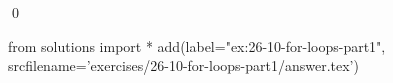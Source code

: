 
\begin{ex}
  \label{ex:26-10-for-loops-part1}
  
  \qed
\end{ex}
\begin{python0}
from solutions import *
add(label="ex:26-10-for-loops-part1",
    srcfilename='exercises/26-10-for-loops-part1/answer.tex')
\end{python0}
